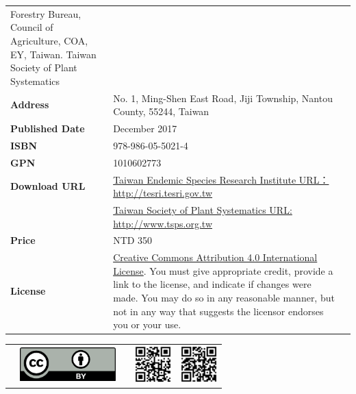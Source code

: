 \begin{table}[H]
{\begin{tabular}{>{\raggedleft\arraybackslash}p{2.5cm}p{9cm}p{3cm}}
                                    Forestry Bureau, Council of Agriculture, COA, EY, Taiwan.
                                    Taiwan Society of Plant Systematics  & \\
      \textbf{Address}            & No. 1, Ming-Shen East Road, Jiji Township, Nantou County, 55244, Taiwan  & \\
      \textbf{Published Date}     & December 2017  & \\
      \textbf{ISBN}               & 978-986-05-5021-4  & \\
      \textbf{GPN}                & 1010602773  & \\
      \textbf{Download URL}  & \href{http://tesri.tesri.gov.tw}{Taiwan Endemic Species Research Institute URL：http://tesri.tesri.gov.tw}  & \\
                                  & \href{http://www.tsps.org.tw}{Taiwan Society of Plant Systematics URL: http://www.tsps.org.tw}  & \\
      \textbf{Price}              & NTD 350  & \\
      \textbf{License}            & \href{https://creativecommons.org/licenses/by/4.0}{Creative Commons Attribution 4.0 International License}.
                                     You must give appropriate credit, provide a link to the license,
                                     and indicate if changes were made. You may do so in any reasonable manner,
                                     but not in any way that suggests the licensor endorses you or your use.  & \\
  \end{tabular}
  }
  \begin{tabular}{p{2.5cm}p{3cm}p{1.0cm}p{1.6cm}p{1.6cm}}
    & \includegraphics[width=10em]{images/ccby40.png} & &
    \includegraphics[width=1.4cm]{images/tesri.png} &
    \includegraphics[width=1.4cm]{images/tsps.png} \\
  \end{tabular}

\end{table}
